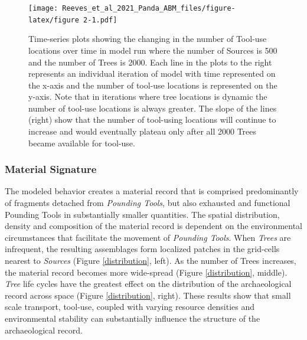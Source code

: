 \documentclass[9pt,twocolumn,twoside,]{pnas-new}
\begin{document}
\begin{figure}
\texttt{[image: Reeves\_et\_al\_2021\_Panda\_ABM\_files/figure-latex/figure 2-1.pdf]}
\caption{Time-series plots showing the changing in the number of Tool-use locations over time in model run where the number of Sources is 500 and the number of Trees is 2000. Each line in the plots to the right represents an individual iteration of model with time represented on the x-axis and the number of tool-use locations is represented on the y-axis. Note that in iterations where tree locations is dynamic the number of tool-use locations is always greater. The slope of the lines (right) show that the number of tool-using locations will continue to increase and would eventually plateau only after all 2000 Trees became available for tool-use.}
\label{tree_death}
\end{figure}

\hypertarget{material-signature}{%
\subsubsection{Material Signature}\label{material-signature}}

The modeled behavior creates a material record that is comprised
predominantly of fragments detached from \emph{Pounding Tools}, but also
exhausted and functional Pounding Tools in substantially smaller
quantities. The spatial distribution, density and composition of the
material record is dependent on the environmental circumstances that
facilitate the movement of \emph{Pounding Tools}. When \emph{Trees} are
infrequent, the resulting assemblages form localized patches in the
grid-cells nearest to \emph{Sources} (Figure \ref{distribution}, left).
As the number of Trees increases, the material record becomes more
wide-spread (Figure \ref{distribution}, middle). \emph{Tree} life cycles
have the greatest effect on the distribution of the archaeological
record across space (Figure \ref{distribution}, right). These results
show that small scale transport, tool-use, coupled with varying resource
densities and environmental stability can substantially influence the
structure of the archaeological record.
\end{document}

